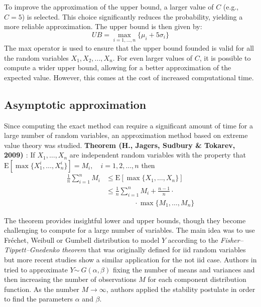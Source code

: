 To improve the approximation of the upper bound, a larger value of \( C \) (e.g., \( C = 5 \)) is selected. This choice significantly reduces the probability, yielding a more reliable approximation. The upper bound is then given by:
$$UB = \max_{i=1, \ldots, n} \{\mu_i + 5 \sigma_i\}$$
The max operator is used to ensure that the upper bound founded is valid for all the random variables $X_1, X_2, ..., X_n$. For even larger values of \( C \), it is possible to compute a wider upper bound, allowing for a better approximation of the expected value. However, this comes at the cost of increased computational time.

\subsection{Asymptotic approximation}
Since computing the exact method can require a significant amount of time for a large number of random variables, an approximation method based on extreme value theory was studied.
\textbf{Theorem (H., Jagers, Sudbury \& Tokarev, 2009) \cite{hamza2009mixing}}: If $X_1, \ldots, X_n$ are independent random variables with the property that  $\mathrm{E}[\max\{X_1^i, \ldots, X_n^i\}] = M_i, \quad i = 1, 2, \ldots, n$ then 
\begin{align*}
    \frac{1}{n} \sum_{i=1}^n M_i &\leq \mathrm{E}[\max\{X_1, \ldots, X_n\}] \\
    &\leq \frac{1}{n} \sum_{i=1}^n M_i + \frac{n-1}{n} \cdot \\ 
    & \qquad \qquad \cdot \max\{M_1, \ldots, M_n\}
\end{align*}

The theorem provides insightful lower and upper bounds, though they become challenging to compute for a large number of variables. The main idea was to use Fréchet, Weibull or Gumbell distribution to model $Y$ according to the \textit{Fisher–Tippett–Gnedenko theorem} \cite{fisher1928limiting} that was originally defined for iid random variables but more recent studies show a similar application for the not iid case. Authors in \cite{padua2013distribution} tried to approximate $Y \dot \sim \ G(\alpha, \beta)$ fixing the number of means and variances and then increasing the number of observations $M$ for each component distribution function. As the number $M \rightarrow \infty$, authors applied the stability postulate in order to find the parameters $\alpha$ and $\beta$.


